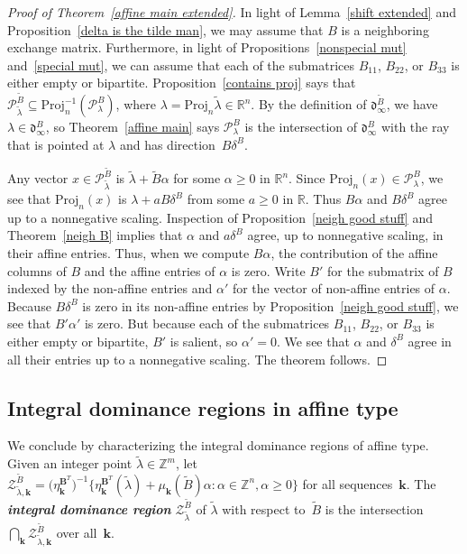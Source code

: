 \documentclass[10pt]{article}
\theoremstyle{definition}
\theoremstyle{remark}
\numberwithin{equation}{section}
\newcommand{\newword}[1]{\textbf{\emph{#1}}}
\newcommand{\integers}{\mathbb Z}
\newcommand{\reals}{\mathbb R}
\newcommand{\sett}[1]{{\bigl\lbrace #1 \bigr\rbrace}}
\newcommand{\0}{{\mathbf{0}}}
\newcommand{\Proj}{\mathrm{Proj}}
\newcommand{\kk}{{\boldsymbol{k}}}
\newcommand{\tB}{{\widetilde{B}}}
\newcommand{\BB}{\mathbf{B}}
\renewcommand{\P}{\mathcal{P}}
\newcommand{\IP}{\mathcal{Z}}
\renewcommand{\d}{{\mathfrak d}}
\begin{document}
\begin{proof}[Proof of Theorem~\ref{affine main extended}]
In light of Lemma~\ref{shift extended} and Proposition~\ref{delta is the tilde man}, we may assume that $B$ is a neighboring exchange matrix.
Furthermore, in light of Propositions~\ref{nonspecial mut} and~\ref{special mut}, we can assume that each of the submatrices $B_{11}$, $B_{22}$, or $B_{33}$ is either empty or bipartite.
  Proposition~\ref{contains proj} says that $\P_{\tilde\lambda}^\tB\subseteq\Proj_n^{-1}(\P_{\lambda}^B)$, where $\lambda=\Proj_n\tilde\lambda\in\reals^n$.
By the definition of $\d_\infty^\tB$, we have $\lambda\in\d_\infty^B$, so Theorem~\ref{affine main} says $\P_{\lambda}^B$ is the intersection of $\d_\infty^B$ with the ray that is pointed at $\lambda$ and has direction~$B\delta^B$.  

  Any vector $x\in\P_{\tilde\lambda}^\tB$ is $\tilde\lambda+\tB\alpha$ for some $\alpha\ge0$ in $\reals^n$.
Since $\Proj_n(x)\in\P_{\lambda}^B$, we see that $\Proj_n(x)$ is $\lambda+aB\delta^B$ from some $a\ge0$ in $\reals$.
Thus $B\alpha$ and $B\delta^B$ agree up to a nonnegative scaling.
Inspection of Proposition~\ref{neigh good stuff} and Theorem~\ref{neigh B} implies that $\alpha$ and $a\delta^B$ agree, up to nonnegative scaling, in their affine entries.
Thus, when we compute $B\alpha$, the contribution of the affine columns of $B$ and the affine entries of $\alpha$ is zero.  
Write $B'$ for the submatrix of $B$ indexed by the non-affine entries and $\alpha'$ for the vector of non-affine entries of $\alpha$.
Because $B\delta^B$ is zero in its non-affine entries by Proposition~\ref{neigh good stuff}, we see that $B'\alpha'$ is zero.
But because each of the submatrices $B_{11}$, $B_{22}$, or $B_{33}$ is either empty or bipartite, $B'$ is salient, so $\alpha'=0$.
We see that $\alpha$ and $\delta^B$ agree in all their entries up to a nonnegative scaling.
The theorem follows.
\end{proof}

\subsection{Integral dominance regions in affine type}
\label{sec:integral}
We conclude by characterizing the integral dominance regions of affine type. 
Given an integer point $\tilde\lambda\in\integers^m$, let $\IP^\tB_{\tilde\lambda,\kk}=\bigl(\eta_{\kk}^{\BB^T}\bigr)^{-1}\sett{\eta_\kk^{\BB^T}(\tilde\lambda)+\mu_\kk(\tB)\alpha:\alpha\in\integers^n,\alpha\ge0}$ for all sequences~$\kk$.
The \newword{integral dominance region} $\IP^\tB_{\tilde\lambda}$ of $\tilde\lambda$ with respect to~$\tB$ is the intersection $\bigcap_\kk\IP^\tB_{\tilde\lambda,\kk}$ over all~$\kk$.
\end{document}
